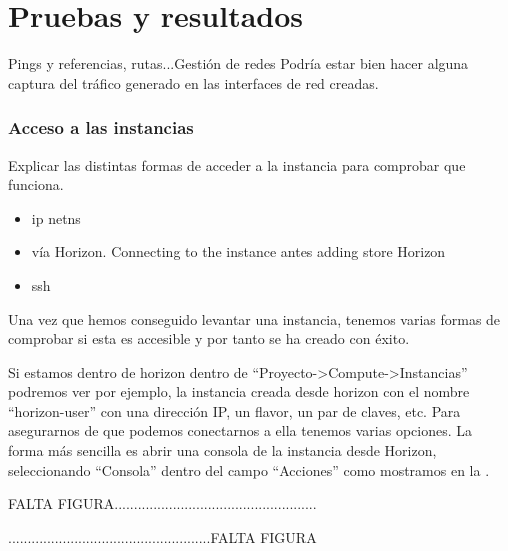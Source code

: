 \chapter{Pruebas y resultados} \label{chap:pruebas}
\begin{tcolorbox}[colback=red!5!white,colframe=red!75!black]
Pings y referencias, rutas...Gestión de redes
Podría estar bien hacer alguna captura del tráfico generado en las interfaces de red creadas.
\end{tcolorbox}

\subsection{Acceso a las instancias}
\begin{tcolorbox}[colback=red!5!white,colframe=red!75!black]
Explicar las distintas formas de acceder a la instancia para comprobar que funciona.
\begin{itemize}
\item ip netns
\item vía Horizon. Connecting to the instance antes adding store Horizon
\item ssh
\end{itemize}

\end{tcolorbox}

Una vez que hemos conseguido levantar una instancia, tenemos varias formas de comprobar si esta es accesible y por tanto se ha creado con éxito.

Si estamos dentro de horizon dentro de “Proyecto-\textgreater Compute-\textgreater Instancias” podremos ver por ejemplo, la instancia creada desde horizon con el nombre “horizon-user” con una dirección IP, un flavor, un par de claves, etc. Para asegurarnos de que podemos conectarnos a ella tenemos varias opciones. La forma más sencilla es abrir una consola de la instancia desde Horizon, seleccionando “Consola” dentro del campo “Acciones” como mostramos en la %
.

\begin{tcolorbox}[colback=green!5!white,colframe=green!75!black]
FALTA FIGURA....................................................

....................................................FALTA FIGURA
\end{tcolorbox}


\begin{comment}
\begin{figure}
    \centering
    \texttt{[image: imagenes/capitulo8/mostarConsola.PNG]}
    \caption{Abriendo consola de la instancia.}
	\vspace{0.3cm}
    \label{mostarConsola}
\end{figure}
\end{comment}

